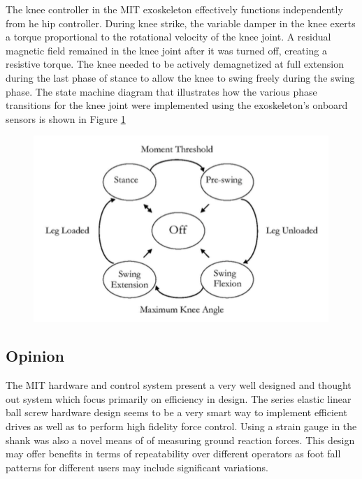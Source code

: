  The knee controller in the MIT exoskeleton effectively functions independently from he hip controller.  During knee strike, the variable damper in the knee exerts a torque proportional to the rotational velocity of the knee joint.  A residual magnetic field remained in the knee joint after it was turned off, creating a resistive torque.  The knee needed to be actively demagnetized at full extension during the last phase of stance to allow the knee to swing freely during the swing phase.  The state machine diagram that illustrates how the various phase transitions for the knee joint were implemented using the exoskeleton's onboard sensors is shown in Figure \ref{fig:kneeControl} 
  \begin{figure}[thpb]
\centering
\includegraphics[width=3.in]{exos/figs/MIT/kneeControl}
  \caption{}
  \vspace{-0.2in}
 \label{fig:kneeControl} 
 \end{figure}  
  
  
% 
 
 
 \subsection{Opinion}
 
 The MIT hardware and control system present a very well designed and thought out system which focus primarily on efficiency in design.  The series elastic linear ball screw hardware design seems to be a very smart way to implement efficient drives as well as to perform high fidelity force control.  Using a strain gauge in the shank was also a novel means of of measuring ground reaction forces.  This design may offer benefits in terms of repeatability over different operators as foot fall patterns for different users may include significant variations.
 
